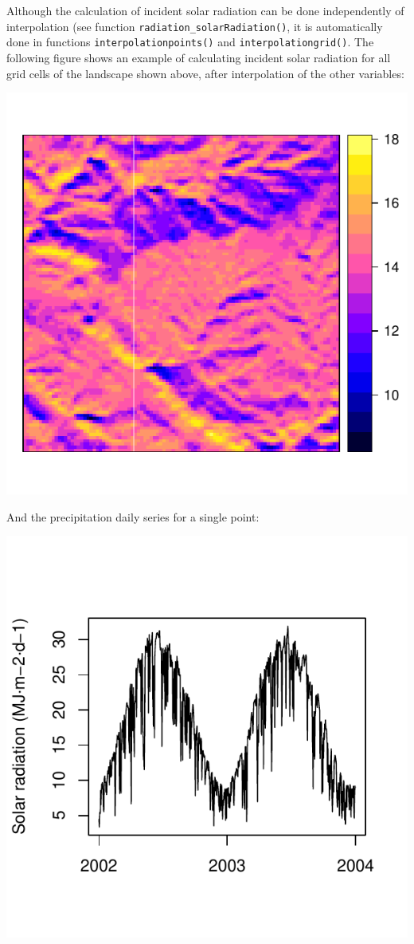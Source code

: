 \documentclass[11pt,a4paper]{article}
\begin{document}
Although the calculation of incident solar radiation can be done independently of interpolation (see function \texttt{radiation\_solarRadiation()}, it is automatically done in functions \texttt{interpolationpoints()} and \texttt{interpolationgrid()}. The following figure shows an example of calculating incident solar radiation for all grid cells of the landscape shown above, after interpolation of the other variables:

\begin{center}
\includegraphics{Meteorology-025}
\end{center}
And the precipitation daily series for a single point:
\begin{center}
\includegraphics{Meteorology-026}
\end{center}
\end{document}
